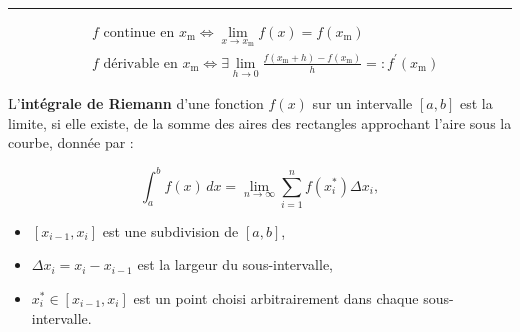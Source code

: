 \hrule
\begin{f} 

\[
\begin{aligned}
& f \text { continue en } x_\mathrm{m} \Leftrightarrow \lim _{x \rightarrow x_\mathrm{m}} f(x)=f\left(x_\mathrm{m}\right) \\
& f \text { dérivable en } x_\mathrm{m} \Leftrightarrow \exists \lim _{h \rightarrow 0} \frac{f\left(x_\mathrm{m}+h\right)-f\left(x_\mathrm{m}\right)}{h}=: f^{\prime}\left(x_\mathrm{m}\right)
\end{aligned}
\]
 
L'\textbf{intégrale de Riemann} d'une fonction \( f(x) \) sur un intervalle \([a, b]\) est la limite, si elle existe, de la somme des aires des rectangles approchant l'aire sous la courbe, donnée par :  

\[
\int_a^b f(x) \, dx = \lim_{n \to \infty} \sum_{i=1}^n f(x_i^*) \Delta x_i,
\]
\begin{itemize}
\item \( [x_{i-1}, x_i] \) est une subdivision de \([a, b]\),  
\item \( \Delta x_i = x_i - x_{i-1} \) est la largeur du sous-intervalle,  
\item \( x_i^* \in [x_{i-1}, x_i] \) est un point choisi arbitrairement dans chaque sous-intervalle.
\end{itemize}
  

\end{f}
